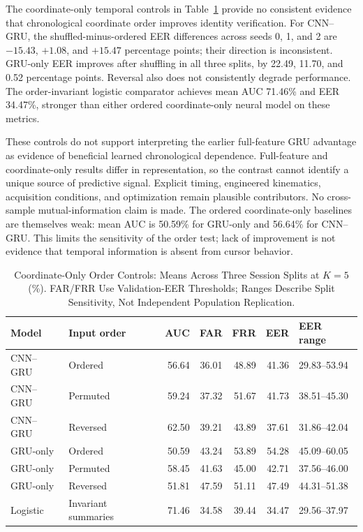 \documentclass[conference]{IEEEtran}
\begin{document}
The coordinate-only temporal controls in Table~\ref{tab:order_controls} provide
no consistent evidence that chronological coordinate order improves identity
verification. For CNN--GRU, the shuffled-minus-ordered EER differences across
seeds 0, 1, and 2 are $-15.43$, $+1.08$, and $+15.47$ percentage points;
their direction is inconsistent. GRU-only EER improves after shuffling in all
three splits, by 22.49, 11.70, and 0.52 percentage points. Reversal also does not
consistently degrade performance. The order-invariant logistic comparator
achieves mean AUC 71.46\% and EER 34.47\%, stronger than either ordered
coordinate-only neural model on these metrics.

These controls do not support interpreting the earlier full-feature GRU
advantage as evidence of beneficial learned chronological dependence.
Full-feature and coordinate-only results differ in representation, so the
contrast cannot identify a unique source of predictive signal. Explicit
timing, engineered kinematics, acquisition conditions, and optimization remain
plausible contributors. No cross-sample mutual-information claim is made.
The ordered coordinate-only baselines are themselves weak: mean AUC is
50.59\% for GRU-only and 56.64\% for CNN--GRU. This limits the sensitivity of
the order test; lack of improvement is not evidence that temporal information
is absent from cursor behavior.

\begin{table}[t]
\centering
\caption{Coordinate-Only Order Controls: Means Across Three Session Splits at
$K=5$ (\%). FAR/FRR Use Validation-EER Thresholds; Ranges Describe Split
Sensitivity, Not Independent Population Replication.}
\label{tab:order_controls}
\begin{tabular}{llrrrrl}
\toprule
Model & Input order & AUC & FAR & FRR & EER & EER range \\
\midrule
CNN--GRU & Ordered & 56.64 & 36.01 & 48.89 & 41.36 & 29.83--53.94 \\
CNN--GRU & Permuted & 59.24 & 37.32 & 51.67 & 41.73 & 38.51--45.30 \\
CNN--GRU & Reversed & 62.50 & 39.21 & 43.89 & 37.61 & 31.86--42.04 \\
GRU-only & Ordered & 50.59 & 43.24 & 53.89 & 54.28 & 45.09--60.05 \\
GRU-only & Permuted & 58.45 & 41.63 & 45.00 & 42.71 & 37.56--46.00 \\
GRU-only & Reversed & 51.81 & 47.59 & 51.11 & 47.49 & 44.31--51.38 \\
Logistic & Invariant summaries & 71.46 & 34.58 & 39.44 & 34.47 & 29.56--37.97 \\
\bottomrule
\end{tabular}
\end{table}
\end{document}
